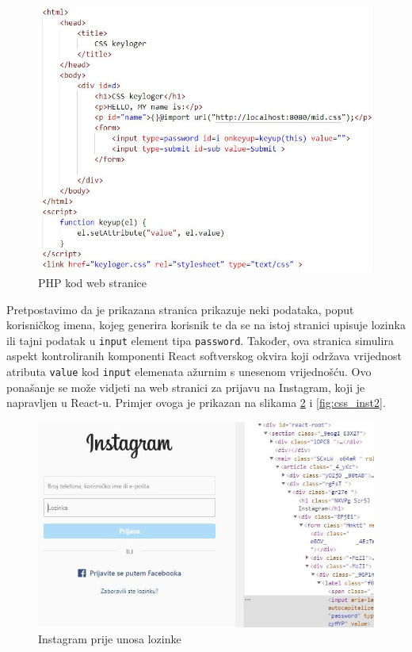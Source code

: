 \documentclass[12pt, oneside, onecolumn]{book}
\begin{document}
{\begin{figure}[H]
	\begin{center}
		\includegraphics[width=\textwidth]{css_cod.jpg}
		\caption{PHP kod web stranice} \label{fig:css_cod}
	\end{center}
\end{figure}

Pretpostavimo da je prikazana stranica prikazuje neki podataka, poput korisničkog imena, kojeg generira korisnik te da se na istoj stranici upisuje lozinka ili tajni podatak u \texttt{input} element tipa \texttt{password}. Također, ova stranica simulira aspekt kontroliranih komponenti React softverskog okvira koji održava vrijednost atributa \texttt{value} kod \texttt{input} elemenata ažurnim s unesenom vrijednošću. Ovo ponašanje se može vidjeti na web stranici za prijavu na Instagram, koji je napravljen u React-u. Primjer ovoga je prikazan na slikama \ref{fig:css_inst} i \ref{fig:css_inst2}.

\begin{figure}[H]
	\begin{center}
		\includegraphics[width=\textwidth]{css_inst.jpg}
		\caption{Instagram prije unosa lozinke} \label{fig:css_inst}
	\end{center}
\end{figure}

}
\end{document}
